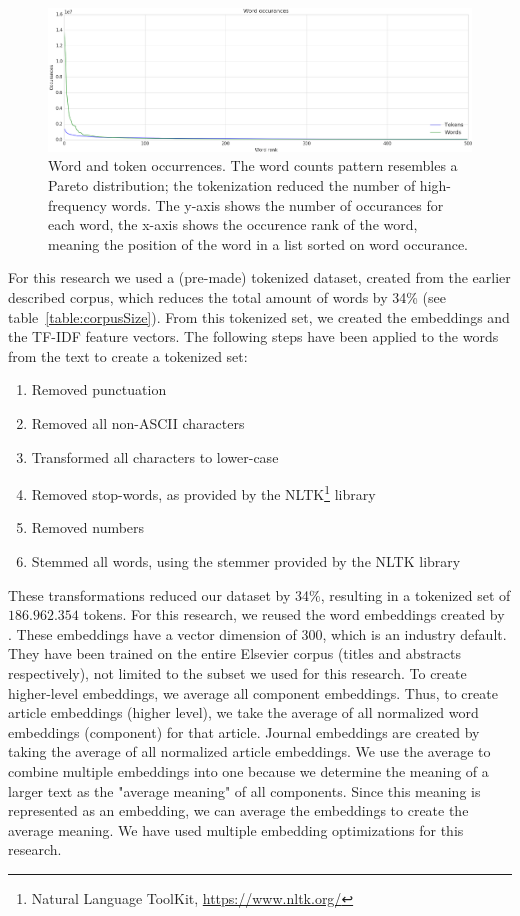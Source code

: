 \documentclass[../../Thesis.tex]{subfiles}
\begin{document}
\FloatBarrier
\begin{figure}[hbt]
\includegraphics[width=6.5in]{Plots/word_occurrences}
\caption{Word and token occurrences. The word counts pattern resembles a Pareto distribution; the tokenization reduced the number of high-frequency words. The y-axis shows the number of occurances for each word, the x-axis shows the occurence rank of the word, meaning the position of the word in a list sorted on word occurance.}\label{figure:wordTokenOccurrence}
\end{figure}
\FloatBarrier
{}
For this research we used a (pre-made) tokenized dataset, created from the earlier described corpus, which reduces the total amount of words by 34\% (see table~\ref{table:corpusSize}). From this tokenized set, we created the embeddings and the TF-IDF feature vectors.
The following steps have been applied to the words from the text to create a tokenized set:
\begin{enumerate}
\item{Removed punctuation}
\item{Removed all non-ASCII characters}
\item{Transformed all characters to lower-case}
\item{Removed stop-words, as provided by the NLTK\footnote{Natural Language ToolKit, \url{https://www.nltk.org/}} library}
\item{Removed numbers}
\item{Stemmed all words, using the stemmer provided by the NLTK library}
\end{enumerate}
These transformations reduced our dataset by 34\%, resulting in a tokenized set of $186.962.354$ tokens.
\clearpage
{}
For this research, we reused the word embeddings created by \citet{Truong2017Thesis}. These embeddings have a vector dimension of 300, which is an industry default. They have been trained on the entire Elsevier corpus (titles and abstracts respectively), not limited to the subset we used for this research. To create higher-level embeddings, we average all component embeddings. Thus, to create article embeddings (higher level), we take the average of all normalized word embeddings (component) for that article. Journal embeddings are created by taking the average of all normalized article embeddings. We use the average to combine multiple embeddings into one because we determine the meaning of a larger text as the "average meaning" of all components. Since this meaning is represented as an embedding, we can average the embeddings to create the average meaning. We have used multiple embedding optimizations for this research.
\end{document}
